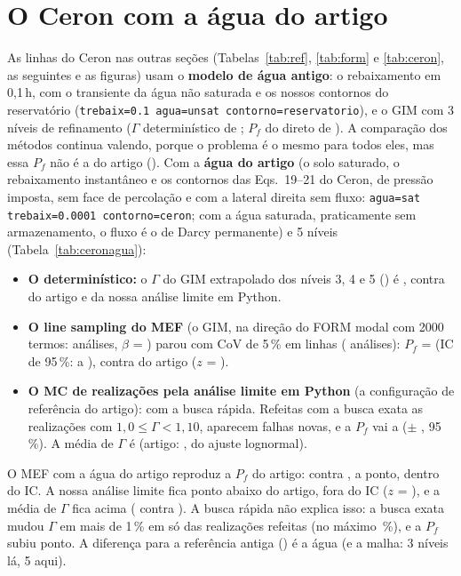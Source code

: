 \documentclass[11pt,a4paper]{article}
\begin{document}
\section{O Ceron com a água do artigo}\label{sec:ceronagua}
As linhas do Ceron nas outras seções (Tabelas~\ref{tab:ref}, \ref{tab:form} e \ref{tab:ceron}, as seguintes e as
figuras) usam o \textbf{modelo de água antigo}: o rebaixamento em 0,1\,h, com o transiente da água não saturada e
os nossos contornos do reservatório (\texttt{trebaix=0.1 agua=unsat contorno=reservatorio}), e o GIM com 3 níveis de
refinamento ($\Gamma$ determinístico de \ceaGvelho; $P_f$ do direto de ). A comparação dos métodos continua
valendo, porque o problema é o mesmo para todos eles, mas essa $P_f$ não é a do artigo (\ceaPfArt). Com a \textbf{água
do artigo} (o solo saturado, o rebaixamento instantâneo e os contornos das Eqs.~19--21 do Ceron, de pressão imposta,
sem face de percolação e com a lateral direita sem fluxo: \texttt{agua=sat trebaix=0.0001 contorno=ceron}; com a água
saturada, praticamente sem armazenamento, o fluxo é o de Darcy permanente) e 5 níveis (Tabela~\ref{tab:ceronagua}):
\begin{itemize}
  \item \textbf{O determinístico:} o $\Gamma$ do GIM extrapolado dos níveis 3, 4 e 5 (\ceaGniveis) é \ceaGdetPz,
    contra \ceaGdetArt{} do artigo e \ceaGdetLa{} da nossa análise limite em Python.
  \item \textbf{O line sampling do MEF} (o GIM, na direção do FORM modal com 2000 termos: \ceaForm{} análises,
    $\beta$ = \ceaBeta) parou com CoV de 5\,\% em \ceaLsN{} linhas (\ceaLsAn{} análises): $P_f$ = \ceaLsPf{} (IC de
    95\,\%: \ceaLsLo{} a \ceaLsHi), contra \ceaPfArt{} do artigo ($z$ = \ceaLsZ).
  \item \textbf{O MC de \ceaMcN{} realizações pela análise limite em Python} (a configuração de referência do artigo):
    \ceaMcPf{} com a busca rápida. Refeitas com a busca exata as \ceaMcRef{} realizações com
    $1{,}0 \le \Gamma < 1{,}10$, aparecem \ceaMcNovas{} falhas novas, e a $P_f$ vai a \ceaMcPfEx{} ($\pm$ \ceaMcIc,
    95\,\%). A média de $\Gamma$ é \ceaGmedLa{} (artigo: \ceaGmedArt, do ajuste lognormal).
\end{itemize}

O MEF com a água do artigo reproduz a $P_f$ do artigo: \ceaLsPf{} contra \ceaPfArt, a \ceaLsDifPt{} ponto, dentro do
IC. A nossa análise limite fica \ceaMcDifPt{} ponto abaixo do artigo, fora do IC ($z$ = \ceaMcZ), e a média de $\Gamma$
fica acima (\ceaGmedLa{} contra \ceaGmedArt). A busca rápida não explica isso: a busca exata mudou $\Gamma$ em mais de
1\,\% em só \ceaExMuda{} das \ceaMcRef{} realizações refeitas (no máximo \ceaExMax\,\%), e a $P_f$ subiu \ceaMcSobe{}
ponto. A diferença para a referência antiga () é a água (e a malha: 3 níveis lá, 5 aqui).
\end{document}
